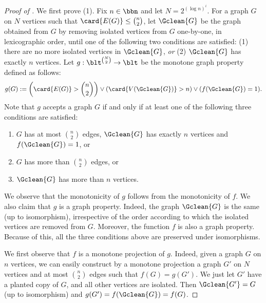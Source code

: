\documentclass[11pt]{article}
\begin{document}
\begin{proof}[Proof of ]
    We first prove (1). 
    Fix $n \in \bbn$
    and let $N = 2^{(\log n)^i}$.
    For a graph $G$ on $N$
    vertices such that 
    $\card{E(G)} \leq \binom{n}{2}$,
    let
    $\Gclean{G}$ be the graph 
    obtained
    from $G$ by removing isolated vertices from $G$ one-by-one,
    in lexicographic order,
    until one of the following two 
    conditions are satisfied:
    (1) there are no more isolated vertices in $\Gclean{G}$,
    \emph{or}
    (2) $\Gclean{G}$ has exactly $n$ vertices.
    Let $g : \blt^{\binom{N}{2}} \to \blt$
    be the monotone graph property defined as follows:
    \begin{align*}
        g(G) := 
        \left(
            \card{E(G)} > 
            \binom{n}{2}
        \right)
        \lor
        \left(
            \card{V(\Gclean{G})} > n
        \right)
        \lor
            (f(\Gclean{G}) = 1).
    \end{align*}
    Note that $g$ accepts a graph $G$
    if and only if at least 
    one of the following three conditions are satisfied:
    \begin{enumerate}
        \item 
            $G$ has at most $\binom{n}{2}$ edges,
            $\Gclean{G}$ has exactly $n$ vertices
            and 
            $f(\Gclean{G}) = 1$,
            or
        \item 
            $G$ has more than $\binom{n}{2}$ edges,
            or
        \item 
            $\Gclean{G}$ has more than $n$ vertices.
    \end{enumerate}
    We observe that the monotonicity of $g$ follows from 
    the monotonicity of $f$.
    We also claim that $g$ is a graph property.
    Indeed, the graph $\Gclean{G}$ is the same (up to isomorphism),
    irrespective  of the order according to which the isolated vertices are
    removed from $G$. Moreover, the function $f$ is also a graph property.
    Because of this, all the three conditions above
    are preserved under isomorphisms.

    We first observe that $f$ is a monotone projection of $g$.
    Indeed, given a graph $G$ on $n$ vertices,
    we can easily construct by a monotone
    projection a graph $G'$ on $N$ vertices
    and at most $\binom{n}{2}$ edges
    such that
    $f(G) = g(G')$.
    We just let $G'$ have a planted copy of $G$,
    and all other vertices are isolated.
    Then $\Gclean{G'} = G$ (up to isomorphism)
    and $g(G') = f(\Gclean{G}) = f(G)$.


\end{proof}
\end{document}
